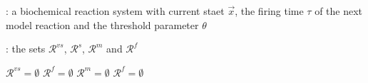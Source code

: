 
\begin{algorithm}[H]
\DontPrintSemicolon
{}

\caption{\protect\TitleFunction{}}
\label{algo:two-class-reaction-partitioning}

\Input: a biochemical reaction system with current staet $\vec{x}$, the firing time $\tau$ of the next model reaction and the threshold parameter $\theta$\;

\Output: the sets $\mathcal{R}^{vs}$, $\mathcal{R}^s$, $\mathcal{R}^m$ and $\mathcal{R}^f$\;

$\mathcal{R}^{vs} = \emptyset$\;
$\mathcal{R}^f = \emptyset$\;
$\mathcal{R}^m = \emptyset$\;
$\mathcal{R}^f = \emptyset$\;

\end{algorithm}
